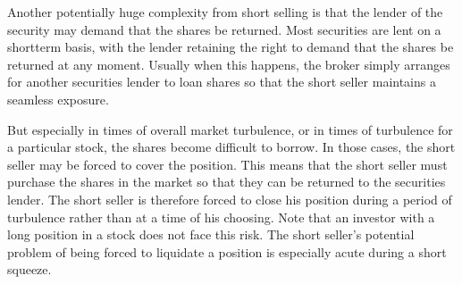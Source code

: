 \documentclass[11pt]{article}
\begin{document}
Another potentially huge complexity from short selling is that the lender of the security may demand that the shares be returned. Most securities are lent on a shortterm basis, with the lender retaining the right to demand that the shares be returned at any moment. Usually when this happens, the broker simply arranges for another securities lender to loan shares so that the short seller maintains a seamless exposure.

But especially in times of overall market turbulence, or in times of turbulence for a particular stock, the shares become difficult to borrow. In those cases, the short seller may be forced to cover the position. This means that the short seller must purchase the shares in the market so that they can be returned to the securities lender. The short seller is therefore forced to close his position during a period of turbulence rather than at a time of his choosing. Note that an investor with a long position in a stock does not face this risk. The short seller's potential problem of being forced to liquidate a position is especially acute during a short squeeze.
\end{document}
